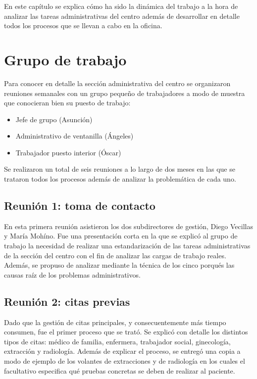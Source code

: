 En este capítulo se explica cómo ha sido la dinámica del trabajo a la hora de analizar las tareas administrativas del centro además de desarrollar en detalle todos los procesos que se llevan a cabo en la oficina. 

\section{Grupo de trabajo}

Para conocer en detalle la sección administrativa del centro se organizaron reuniones semanales con un grupo pequeño de trabajadores a modo de muestra que conocieran bien su puesto de trabajo:

\begin{itemize}
    \item Jefe de grupo (Asunción)
    \item Administrativo de ventanilla (Ángeles)
    \item Trabajador puesto interior (Óscar)
\end{itemize}

Se realizaron un total de seis reuniones a lo largo de dos meses en las que se trataron todos los procesos además de analizar la problemática de cada uno.

\subsection{Reunión 1: toma de contacto}

En esta primera reunión asistieron los dos subdirectores de gestión, Diego Vecillas y María Mohíno. Fue una presentación corta en la que se explicó al grupo de trabajo la necesidad de realizar una estandarización de las tareas administrativas de la sección del centro con el fin de analizar las cargas de trabajo reales. Además, se propuso de analizar mediante la técnica de los cinco porqués las causas raíz de los problemas administrativos.

\subsection{Reunión 2: citas previas}

Dado que la gestión de citas principales, y consecuentemente más tiempo consumen, fue el primer proceso que se trató. Se explicó con detalle los distintos tipos de citas: médico de familia, enfermera, trabajador social, ginecología, extracción y radiología. Además de explicar el proceso, se entregó una copia a modo de ejemplo de los volantes de extracciones y de radiología en los cuales el facultativo especifica qué pruebas concretas se deben de realizar al paciente.

